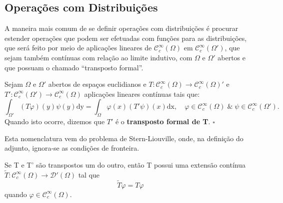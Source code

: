 \documentclass[../distribution_theory_notes.tex]{subfiles}
\begin{document}
 \subsection{Operações com Distribuições}
  A maneira mais comum de se definir operações com distribuições é procurar estender operações que podem ser efetuadas com funções para as distribuições, que será feito por meio de aplicações lineares de \(\mathcal{C}_{c}^{\infty}(\Omega )\) em \(\mathcal{C}_{c}^{\infty}(\Omega ')\), que sejam também contínuas com relação ao limite indutivo, com \(\Omega \) e \(\Omega '\) abertos e que possuam o chamado ``transposto formal''.
 \begin{def*}
   Sejam \(\Omega \) e \(\Omega '\) abertos de espaços euclidianos e \(T:\mathcal{C}_{c}^{\infty}(\Omega )\rightarrow \mathcal{C}_{c}^{\infty}(\Omega )'\) e \(T':\mathcal{C}_{c}^{\infty}(\Omega') \rightarrow \mathcal{C}_{c}^{\infty}(\Omega )\) aplicações lineares contínuas tais que: 
     \[
       \int_{\Omega '}^{}(T\varphi )(y)\psi (y) \mathrm{dy} = \int_{\Omega }^{}\varphi (x)(T'\psi )(x) \mathrm{dx},\quad \varphi \in \mathcal{C}_{c}^{\infty}(\Omega )\;\&\; \psi\in \mathcal{C}_{c}^{\infty}(\Omega ').
     \]
     Quando isto ocorre, dizemos que \(T'\) é o \textbf{transposto formal de T}. \(\square\)
 \end{def*}
 Esta nomenclatura vem do problema de Stern-Liouville, onde, na definição do adjunto, ignora-se as condições de fronteira. 
\begin{lemma*}
  Se T e T' são transpostos um do outro, então T possui uma extensão contínua \(\tilde{T}:\mathcal{C}_{c}^{\infty}(\Omega )\rightarrow \mathcal{D}'(\Omega )\) tal que 
    \[
      \tilde{T}\varphi = T\varphi 
    \]
    quando \(\varphi \in \mathcal{C}_{c}^{\infty}(\Omega )\). 
\end{lemma*}
\end{document}
